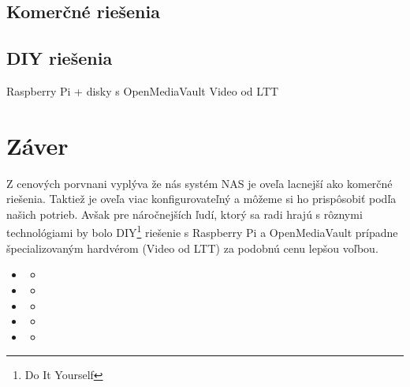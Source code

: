 \documentclass[12pt,oneside,slovak,a4paper]{article}
\begin{document}
\subsection{Komerčné riešenia}

\subsection{DIY riešenia}
Raspberry Pi + disky s OpenMediaVault
Video od LTT

\section{Záver}
Z cenových porvnani vyplýva že nás systém NAS je oveľa lacnejší ako komerčné riešenia. Taktiež je oveľa viac konfigurovateľný a môžeme si ho prispôsobiť podľa našich potrieb. Avšak pre náročnejších ľudí, ktorý sa radi hrajú s rôznymi technológiami by bolo DIY\footnote{Do It Yourself} riešenie s Raspberry Pi a OpenMediaVault prípadne špecializovaným hardvérom (Video od LTT) za podobnú cenu lepšou voľbou.

\begin{spacing}{1.0}
\begin{itemize}
	\item 
		\begin{itemize}
			\item 
		\end{itemize}
	\item 
		\begin{itemize}
			\item 
		\end{itemize}
	\item 
		\begin{itemize}
			\item 
		\end{itemize}
	\item 
		\begin{itemize}
			\item 
		\end{itemize}
	\item 
		\begin{itemize}
			\item 
		\end{itemize}
\end{itemize}
\end{spacing}




\end{document}
